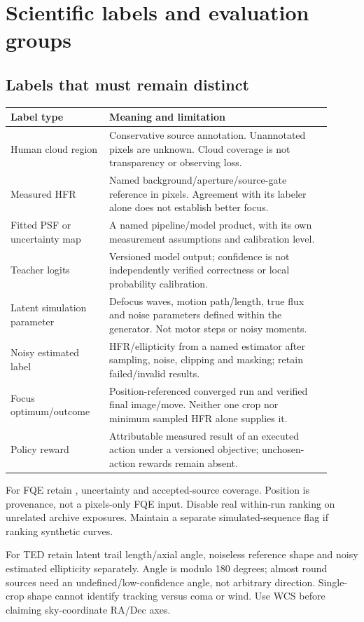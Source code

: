 \documentclass[11pt,a4paper]{article}
\newcommand{\code}[1]{\texttt{\detokenize{#1}}}
\begin{document}
\section{Scientific labels and evaluation groups}
\subsection{Labels that must remain distinct}
\begin{longtable}{@{}L{0.28\linewidth}L{0.63\linewidth}@{}}
\toprule Label type & Meaning and limitation\\\midrule\endhead
Human cloud region & Conservative source annotation. Unannotated pixels are
unknown. Cloud coverage is not transparency or observing loss.\\
Measured HFR & Named background/aperture/source-gate reference in pixels.
Agreement with its labeler alone does not establish better focus.\\
Fitted PSF or uncertainty map & A named pipeline/model product, with its own
measurement assumptions and calibration level.\\
Teacher logits & Versioned model output; confidence is not independently
verified correctness or local probability calibration.\\
Latent simulation parameter & Defocus waves, motion path/length, true flux and
noise parameters defined within the generator. Not motor steps or noisy moments.\\
Noisy estimated label & HFR/ellipticity from a named estimator after sampling,
noise, clipping and masking; retain failed/invalid results.\\
Focus optimum/outcome & Position-referenced converged run and verified final
image/move. Neither one crop nor minimum sampled HFR alone supplies it.\\
Policy reward & Attributable measured result of an executed action under a
versioned objective; unchosen-action rewards remain absent.\\
\bottomrule
\end{longtable}

For FQE retain \code{log(HFR_px)}, uncertainty and accepted-source coverage.
Position is provenance, not a pixels-only FQE input. Disable real within-run
ranking on unrelated archive exposures. Maintain a separate simulated-sequence
flag if ranking synthetic curves.

For TED retain latent trail length/axial angle, noiseless reference shape and
noisy estimated ellipticity separately. Angle is modulo 180 degrees; almost
round sources need an undefined/low-confidence angle, not arbitrary direction.
Single-crop shape cannot identify tracking versus coma or wind. Use WCS before
claiming sky-coordinate RA/Dec axes.
\end{document}
